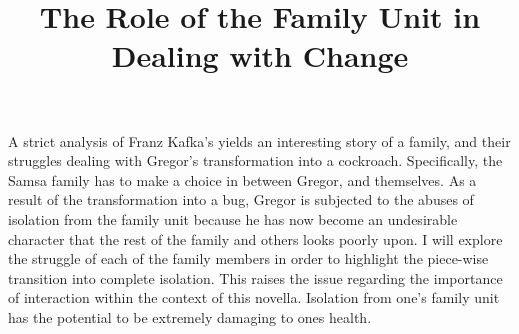 \documentclass{article}
\title{The Role of the Family Unit in Dealing with Change}
\begin{document}
\makeheader





A strict analysis of Franz Kafka's  yields an
interesting story of a family, and their struggles dealing with Gregor's
transformation into a cockroach. Specifically, the Samsa family has to make
a choice in between Gregor, and themselves. As a result of the
transformation into a bug, Gregor is subjected to the abuses of isolation
from the family unit because he has now become an undesirable character that
the rest of the family and others looks poorly upon. I will explore the
struggle of each of the family members in order to highlight the piece-wise
transition into complete isolation. This raises the issue regarding the
importance of interaction within the context of this novella. Isolation from
one's family unit has the potential to be extremely damaging to ones health.

\end{document}
